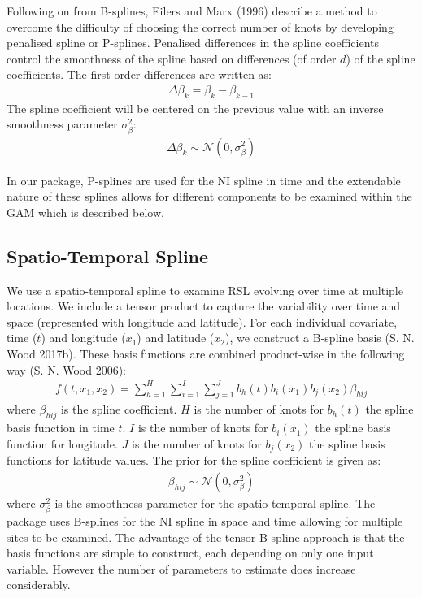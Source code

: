Following on from B-splines, Eilers and Marx (1996) describe a method to overcome the difficulty of choosing the correct number of knots by developing penalised spline or P-splines. Penalised differences in the spline coefficients control the smoothness of the spline based on differences (of order \(d\)) of the spline coefficients. The first order differences are written as:
\begin{align}
\Delta\beta_k = \beta_k - \beta_{k-1}
\end{align}
The spline coefficient will be centered on the previous value with an inverse smoothness parameter \(\sigma^2_{\beta}\):
\begin{align}
\Delta \beta_k \sim \mathcal{N}(0, \sigma_{\beta}^2)
\end{align}

In our package, P-splines are used for the NI spline in time and the extendable nature of these splines allows for different components to be examined within the GAM which is described below.

\hypertarget{spatialtemporalspline}{%
\subsection{Spatio-Temporal Spline}\label{spatialtemporalspline}}

We use a spatio-temporal spline to examine RSL evolving over time at multiple locations. We include a tensor product to capture the variability over time and space (represented with longitude and latitude). For each individual covariate, time (\(t\)) and longitude (\(x_1\)) and latitude (\(x_2\)), we construct a B-spline basis (S. N. Wood 2017b). These basis functions are combined product-wise in the following way (S. N. Wood 2006):
\begin{align}
  f(t,x_1,x_2) = \sum_{h=1}^{H}\sum_{i=1}^{I}\sum_{j=1}^{J} b_h(t) b_i(x_1) b_j(x_2) \beta_{hij}
\end{align}
where \(\beta_{hij}\) is the spline coefficient. \(H\) is the number of knots for \(b_h(t)\) the spline basis function in time \(t\). \(I\) is the number of knots for \(b_i(x_1)\) the spline basis function for longitude. \(J\) is the number of knots for \(b_j(x_2)\) the spline basis functions for latitude values. The prior for the spline coefficient is given as:
\begin{align}
\beta_{hij} \sim \mathcal{N} (0, \sigma^2_{\beta})
\end{align}
where \(\sigma^2_{\beta}\) is the smoothness parameter for the spatio-temporal spline. The  package uses B-splines for the NI spline in space and time allowing for multiple sites to be examined. The advantage of the tensor B-spline approach is that the basis functions are simple to construct, each depending on only one input variable. However the number of parameters to estimate does increase considerably.

